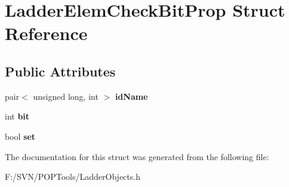 \hypertarget{struct_ladder_elem_check_bit_prop}{\section{Ladder\-Elem\-Check\-Bit\-Prop Struct Reference}
\label{struct_ladder_elem_check_bit_prop}
}
\subsection*{Public Attributes}
\begin{DoxyCompactItemize}
\item 
\hypertarget{struct_ladder_elem_check_bit_prop_a894f61904e2736ab103be84f44e12a9e}{pair$<$ unsigned long, int $>$ {\bfseries id\-Name}}\label{struct_ladder_elem_check_bit_prop_a894f61904e2736ab103be84f44e12a9e}

\item 
\hypertarget{struct_ladder_elem_check_bit_prop_aa2bf712bfe21b69416f09aa870b64e0b}{int {\bfseries bit}}\label{struct_ladder_elem_check_bit_prop_aa2bf712bfe21b69416f09aa870b64e0b}

\item 
\hypertarget{struct_ladder_elem_check_bit_prop_a89cc8a744143f278422dd7380295e3d4}{bool {\bfseries set}}\label{struct_ladder_elem_check_bit_prop_a89cc8a744143f278422dd7380295e3d4}

\end{DoxyCompactItemize}


The documentation for this struct was generated from the following file\-:\begin{DoxyCompactItemize}
\item 
F\-:/\-S\-V\-N/\-P\-O\-P\-Tools/Ladder\-Objects.\-h\end{DoxyCompactItemize}
